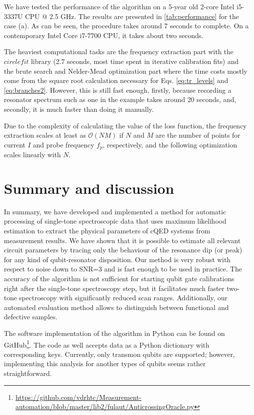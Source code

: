 \documentclass[%
 aip,
 amsmath,amssymb,
 reprint,%
]{revtex4-1}
\begin{document}
We have tested the performance of the algorithm on a 5-year old 2-core Intel i5-3337U CPU @ 2.5 GHz. The results are presented in \autoref{tab:performance} for the case (a).  As can be seen, the procedure takes around 7 seconds to complete. On a contemporary Intel Core i7-7700 CPU, it takes about two seconds. 

The heaviest computational tasks are the frequency extraction part with the $circlefit$ library (2.7 seconds, most time spent in iterative calibration fits) and the brute search and Nelder-Mead optimization part where the time costs mostly come from the square root calculation necessary for Eqs. \eqref{eq:tr_levels} and \eqref{eq:branches2}. However, this is still fast enough, firstly, because recording a resonator spectrum such as one in the example takes around 20 seconds, and, secondly, it is much faster than doing it manually. 

Due to the complexity of calculating the value of the loss function, the frequency extraction scales at least as $\mathcal{O}(NM)$ if $N$ and $M$ are the number of points for current $I$ and probe frequency $f_p$, respectively, and the following optimization scales linearly with $N$. 

\section{Summary and discussion}

In summary, we have developed and implemented a method for automatic processing of single-tone spectroscopic data that uses maximum likelihood estimation to extract the physical parameters of cQED systems from measurement results. We have shown that it is possible to estimate all relevant circuit parameters by tracing only the behaviour of the resonance dip (or peak) for any kind of qubit-resonator disposition. Our method is very robust with respect to noise down to SNR=3 and is fast enough to be used in practice. The accuracy of the algorithm is not sufficient for starting qubit gate calibrations right after the single-tone spectroscopy step, but it facilitates much faster two-tone spectroscopy with significantly reduced scan ranges. Additionally, our automated evaluation method allows to distinguish between functional and defective samples.

The software implementation of the algorithm in Python can be found on GitHub\footnote{\url{https://github.com/vdrhtc/Measurement-automation/blob/master/lib2/fulaut/AnticrossingOracle.py}}. The code as well accepts data as a Python dictionary with corresponding keys. Currently, only transmon qubits are supported; however, implementing this analysis for another types of qubits seems rather straightforward.
\end{document}
